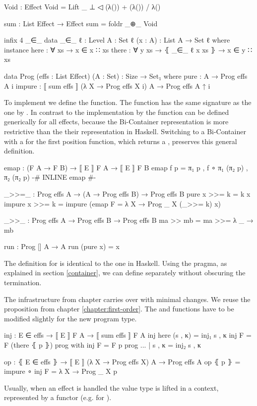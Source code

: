 \begin{code}[hide]
Void : Effect
Void = Lift _ ⊥ ◁ (λ()) + (λ()) / λ()

sum : List Effect → Effect
sum = foldr _⊕_ Void

infix 4 _∈_
data _∈_ {ℓ : Level} {A : Set ℓ} (x : A) : List A → Set ℓ where
  instance
    here   : ∀ {xs} → x ∈ x ∷ xs
    there  : ∀ {y xs} → ⦃ _∈_ {ℓ} x xs ⦄ → x ∈ y ∷ xs
\end{code}
\begin{code}
data Prog (effs : List Effect) (A : Set) : {Size} → Set₁ where
  pure    : A → Prog effs A {i}
  impure  : ⟦ sum effs ⟧ (λ X → Prog effs X {i}) A → Prog effs A {↑ i}
\end{code}
To implement \AgdaFunction{>>=} we define the  function.
The function has the same signature as the one by
\textcite{DBLP:conf/haskell/WuSH14}.
In contrast to the implementation by \textcite{DBLP:conf/haskell/WuSH14} the
function can be defined generically for all effects, because the Bi-Container
representation is more restrictive than the their representation in Haskell.
Switching to a Bi-Container with a  for the first position
function, which returns a , preserves this general
definition. %

\begin{code}
emap : (F A → F B) → ⟦ E ⟧ F A → ⟦ E ⟧ F B
emap f p = π₁ p , f ∘ π₁ (π₂ p) , π₂ (π₂ p)
{-# INLINE emap #-}

_>>=_ : Prog effs A → (A → Prog effs B) → Prog effs B
pure x    >>= k = k x
impure x  >>= k = impure (emap {F = λ X → Prog _ X} (_>>= k) x)
\end{code}
\begin{code}[hide]
_>>_ : Prog effs A → Prog effs B → Prog effs B
ma >> mb = ma >>= λ _ → mb

run : Prog [] A → A
run (pure x) = x
\end{code}
The definition for \AgdaFunction{>>=} is identical to the one in Haskell.
Using the  pragma, as explained in section \ref{container},
we can define  separately without obscuring the termination.

The infrastructure from chapter carries over with
minimal changes.
We reuse the  proposition from chapter
\ref{chapter:first-order}.
The  and  functions have to be modified
slightly for the new program type.

\begin{code}
inj : E ∈ effs → ⟦ E ⟧ F A → ⟦ sum effs ⟧ F A
inj here           (s , κ) = inj₁ s , κ
inj {F = F} (there ⦃ p ⦄)  prog with inj {F = F} p prog
... | s , κ = inj₂ s , κ

op : ⦃ E ∈ effs ⦄ → ⟦ E ⟧ (λ X → Prog effs X) A → Prog effs A
op ⦃ p ⦄ = impure ∘ inj {F = λ X → Prog _ X} p
\end{code}
Usually, when an effect is handled the value type is lifted in a context,
represented by a functor (e.g.  for ).

